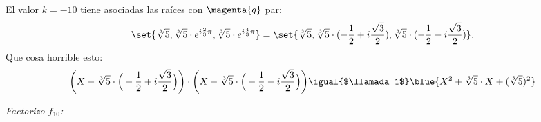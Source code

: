 El valor $k = -10$ tiene asociadas las raíces con $\magenta{q}$ par:
$$
  \set{\sqrt[3]{5}, \sqrt[3]{5} \cdot e^{i\frac{2}{3}\pi}, \sqrt[3]{5} \cdot e^{i\frac{4}{3}\pi} } =
  \set{\sqrt[3]{5}, \sqrt[3]{5} \cdot (- \frac{1}{2} + i\frac{\sqrt{3}}{2}), \sqrt[3]{5} \cdot (- \frac{1}{2} - i\frac{\sqrt{3}}{2}) }.
$$
Que cosa horrible esto:
$$
  \bigg(X - \sqrt[3]{5} \cdot \Big(- \frac{1}{2} + i\frac{\sqrt{3}}{2}\Big)\bigg)
  \cdot
  \bigg(X - \sqrt[3]{5} \cdot \Big(- \frac{1}{2} - i\frac{\sqrt{3}}{2}\Big)\bigg)
  \igual{$\llamada1$}
  \blue{X^2  + \sqrt[3]{5} \cdot X + (\sqrt[3]{5})^2}
$$

\begin{center}
\end{center}

\bigskip

\textit{Factorizo $f_{10}$:}

